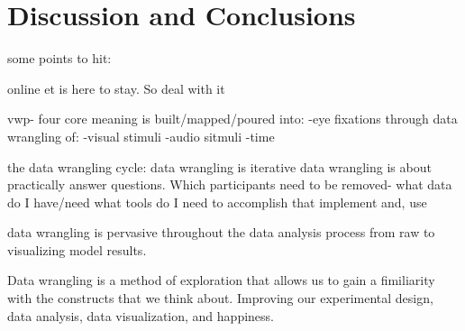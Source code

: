 \section{Discussion and Conclusions}

some points to hit:


online et is here to stay. So deal with it

vwp- four core
meaning is built/mapped/poured into:
-eye fixations
through data wrangling of:
-visual stimuli
-audio sitmuli
-time


the data wrangling cycle: 
data wrangling is iterative
data wrangling is about practically answer questions. Which participants need to be removed-
what data do I have/need
what tools do I need to accomplish that
implement
and, use

data wrangling is pervasive throughout the data analysis process from raw to visualizing model results.

Data wrangling is a method of exploration that allows us to gain a fimiliarity with the constructs that we think about. Improving our experimental design, data analysis, data visualization, and happiness.